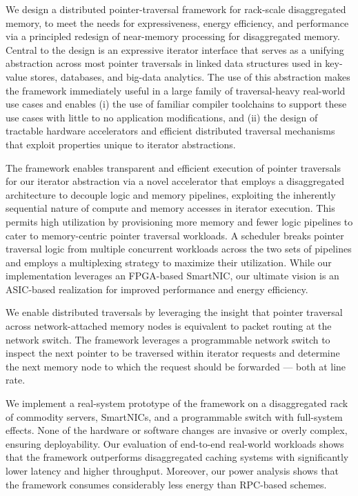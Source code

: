 We design a distributed pointer-traversal framework for rack-scale disaggregated memory, to meet the needs for expressiveness, energy efficiency, and performance via a principled redesign of near-memory processing for disaggregated memory. Central to the design is an expressive iterator interface that serves as a unifying abstraction across most pointer traversals in linked data structures used in key-value stores, databases, and big-data analytics. The use of this abstraction makes the framework immediately useful in a large family of traversal-heavy real-world use cases and enables (i) the use of familiar compiler toolchains to support these use cases with little to no application modifications, and (ii) the design of tractable hardware accelerators and efficient distributed traversal mechanisms that exploit properties unique to iterator abstractions.

The framework enables transparent and efficient execution of pointer traversals for our iterator abstraction via a novel accelerator that employs a disaggregated architecture to decouple logic and memory pipelines, exploiting the inherently sequential nature of compute and memory accesses in iterator execution. This permits high utilization by provisioning more memory and fewer logic pipelines to cater to memory-centric pointer traversal workloads. A scheduler breaks pointer traversal logic from multiple concurrent workloads across the two sets of pipelines and employs a multiplexing strategy to maximize their utilization. While our implementation leverages an FPGA-based SmartNIC, our ultimate vision is an ASIC-based realization for improved performance and energy efficiency.

We enable distributed traversals by leveraging the insight that pointer traversal across network-attached memory nodes is equivalent to packet routing at the network switch. The framework leverages a programmable network switch to inspect the next pointer to be traversed within iterator requests and determine the next memory node to which the request should be forwarded — both at line rate.

We implement a real-system prototype of the framework on a disaggregated rack of commodity servers, SmartNICs, and a programmable switch with full-system effects. None of the hardware or software changes are invasive or overly complex, ensuring deployability. Our evaluation of end-to-end real-world workloads shows that the framework outperforms disaggregated caching systems with significantly lower latency and higher throughput. Moreover, our power analysis shows that the framework consumes considerably less energy than RPC-based schemes.


